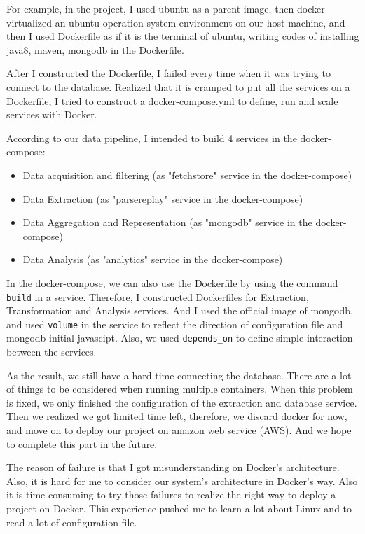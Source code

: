 \documentclass{article}
\newcommand{\codeinline}[1]{
    \texttt{#1}
}
\begin{document}
For example, in the project, I used ubuntu as a parent image, then docker virtualized an ubuntu operation system environment on our host machine, and then I used Dockerfile as if it is the terminal of ubuntu, writing codes of installing java8, maven, mongodb in the Dockerfile.

After I constructed the Dockerfile, I failed every time when it was trying to connect to the database. Realized that it is cramped to put all the services on a Dockerfile, I tried to construct a docker-compose.yml to define, run and scale services with Docker.

According to our data pipeline, I intended to build 4 services in the docker-compose:
    \begin{itemize}
        \item Data acquisition and filtering (as "fetchstore" service in the docker-compose)
        \item Data Extraction (as "parsereplay" service in the docker-compose)
        \item Data Aggregation and Representation (as "mongodb" service in the docker-compose)
        \item Data Analysis (as "analytics" service in the docker-compose)
    \end{itemize}

In the docker-compose, we can also use the Dockerfile by using the command \codeinline{build} in a service. Therefore, I constructed Dockerfiles for Extraction, Transformation and Analysis services. And I used the official image of mongodb, and used \codeinline{volume} in the service to reflect the direction of configuration file and mongodb initial javascipt. Also, we used \codeinline{depends_on} to define simple interaction between the services.

As the result, we still have a hard time connecting the database. There are a lot of things to be considered when running multiple containers. When this problem is fixed, we only finished the configuration of the extraction and database service. Then we realized we got limited time left, therefore, we discard docker for now, and move on to deploy our project on amazon web service (AWS). And we hope to complete this part in the future.

The reason of failure is that I got misunderstanding on Docker's architecture. Also, it is hard for me to consider our system's architecture in Docker's way. Also it is time consuming to try those failures to realize the right way to deploy a project on Docker. This experience pushed me to learn a lot about Linux and to read a lot of configuration file.
\end{document}
